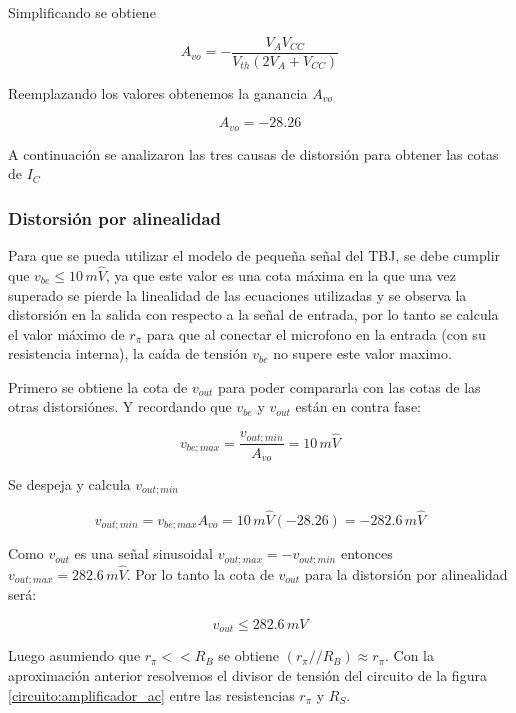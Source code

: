 \documentclass[10pt,spanish,a4paper,openany,notitlepage]{article}
\begin{document}
Simplificando se obtiene

\begin{equation}
\displaystyle A_{vo} = -\frac{V_A V_{CC}}{V_{th} (2 V_A + V_{CC})}
\label{eq:Avo}
\end{equation}

Reemplazando los valores obtenemos la ganancia $A_{vo}$

\[ \displaystyle A_{vo} = -28.26 \]

A continuación se analizaron las tres causas de distorsión para obtener las
cotas de $I_C$

\subsubsection{Distorsión por alinealidad}

Para que se pueda utilizar el modelo de pequeña señal del TBJ, se
debe cumplir que $v_{be} \leqslant 10\,\unit{m\widehat{V}}$, ya que este valor es una 
cota máxima en la que una vez superado se pierde la linealidad de las 
ecuaciones utilizadas y se observa la distorsión en la salida con 
respecto a la señal de entrada, por lo tanto se calcula el valor  
máximo de $r_{\pi}$ para que al conectar el microfono en la entrada 
(con su resistencia interna), la caída de tensión $v_{be}$ no supere este valor 
maximo.

Primero se obtiene la cota de $v_{out}$ para poder compararla con las
cotas de las otras distorsiónes. Y recordando que $v_{be}$ y $v_{out}$
están en contra fase:

\[ \displaystyle v_{be;max} = \frac{v_{out;min}}{A_{vo}} = 10\,\unit{m\widehat{V}}\]

Se despeja y calcula $v_{out;min}$

\[ \displaystyle v_{out;min} = v_{be;max} A_{vo} = 10\,\unit{m\widehat{V}} (-28.26) = -282.6 \,\unit{m\widehat{V}}\]

Como $v_{out}$ es una señal sinusoidal $v_{out;max} = -v_{out;min}$ entonces
$v_{out;max} = 282.6 \,\unit{m\widehat{V}}$. 
Por lo tanto la cota de $v_{out}$ para la distorsión por alinealidad será:

\begin{equation}
v_{out} \leqslant 282.6\, \unit{mV}
\label{eq:vout_alinealidad}
\end{equation}


Luego asumiendo que $r_\pi << R_B$ se obtiene $(r_\pi // R_B) \approx r_\pi$.
Con la aproximación anterior resolvemos el divisor de tensión del circuito
de la figura \ref{circuito:amplificador_ac} entre las resistencias $r_\pi$
y $R_S$.
\end{document}
